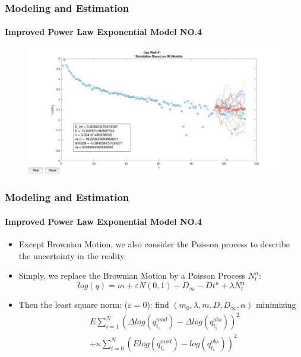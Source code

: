 \documentclass[11pt]{beamer}
\begin{document}
\begin{frame}
	\frametitle{Modeling and Estimation}
	\framesubtitle{Improved Power Law Exponential Model NO.4}
	\justifying
\begin{figure}
\begin{center}
\includegraphics[width=1.1\textwidth  ]{well1} 
\end{center}
\end{figure}				
\end{frame}	

	\begin{frame}
		\frametitle{Modeling and Estimation}
		\framesubtitle{Improved Power Law Exponential Model NO.4}
		\justifying
\begin{itemize}
		\item Except Brownian Motion, we also consider the Poisson process to describe the uncertainty in the reality.
		\item Simply, we replace the Brownian Motion by a Poisson Process $N_t^{\alpha}$:
		\begin{equation}
		log(q)=m+\varepsilon N(0,1)-D_\infty - Dt^n+\lambda N_t^{\alpha}
		\end{equation}
		\item Then the least square norm: ($\varepsilon=0$): find $(m_0,\lambda,m,D,D_{\infty},\alpha)$ minimizing
		\begin{eqnarray*}
		&E\sum_{i=1}^N\left(\Delta log(q^{mod}_{t_i})-\Delta log(q^{obs}_{t_{i}}) \right)^2
		\\
		&
		+\kappa\sum_{i=0}^N \left(E log(q^{mod}_{t_i})- log(q^{obs}_{t_{i}}) \right)^2
		\end{eqnarray*}
		\end{itemize}	
			\end{frame}	
	
\end{document}
